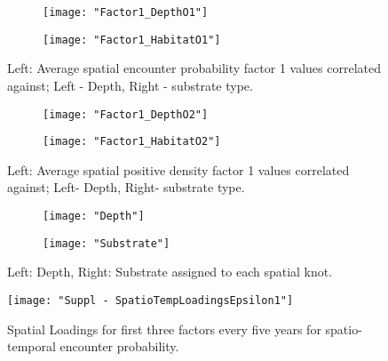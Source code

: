 \documentclass{article}
\newcommand{\beginsupplement}{%
		        \setcounter{table}{0}
		        \renewcommand{\thetable}{S\arabic{table}}%
		        \setcounter{figure}{0}
		        \renewcommand{\thefigure}{S\arabic{figure}}%
			     }
\begin{document}
\beginsupplement




\begin{figure}[!ht]
	\label{fig:S1}
	\begin{subfigure}{0.5\textwidth}
	\texttt{[image: "Factor1\_DepthO1"]}
\end{subfigure}
\begin{subfigure}{0.5\textwidth}
	\texttt{[image: "Factor1\_HabitatO1"]}
\end{subfigure}
\caption{Left: Average spatial encounter probability factor 1 values correlated
	against; Left - Depth, Right - substrate type.}

\end{figure}


\begin{figure}[!ht]
	\label{fig:S2}
	
\begin{subfigure}{0.5\textwidth}
	\texttt{[image: "Factor1\_DepthO2"]}
\end{subfigure}
\begin{subfigure}{0.5\textwidth}
	\texttt{[image: "Factor1\_HabitatO2"]}
\end{subfigure}
\caption{Left: Average spatial positive density factor 1 values correlated
	against; Left- Depth, Right- substrate type.}

\end{figure}

\begin{figure}[!ht]
	\label{fig:S3}
\begin{subfigure}{0.55\textwidth}
\texttt{[image: "Depth"]}
\end{subfigure}	
\begin{subfigure}{0.45\textwidth}
\texttt{[image: "Substrate"]}
\end{subfigure}
\caption{Left: Depth, Right: Substrate assigned to each spatial knot.}

\end{figure}


\begin{figure}
\begin{center}
	\texttt{[image: "Suppl - SpatioTempLoadingsEpsilon1"]}
	\label{fig:S5}
	\caption{Spatial Loadings for first three factors every five years for
	spatio-temporal encounter probability.}
	\end{center}
\end{figure}
\end{document}
